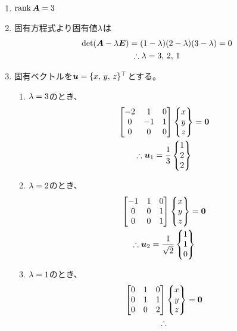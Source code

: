 \begin{ans*}
  ${}$
  \begin{enumerate}[label=(\arabic*)]
    \item $\operatorname{rank}\bm{A} = 3$
    \item 固有方程式より固有値${\lambda}$は
    \begin{gather}
      \det(\bm{A} - {\lambda}\bm{E}) = (1-{\lambda})(2-{\lambda})(3-{\lambda}) = 0 \\
      \therefore {\lambda} = 3,\,2,\,1
    \end{gather}
    \item 固有ベクトルを${\bm{u}} = \{x,\,y,\,z\}^{\top}$とする。
    \begin{enumerate}[label=(\roman*)]
      \item ${\lambda} = 3$のとき、
      \begin{gather}
        \begin{bmatrix}
          -2 & 1 & 0 \\
          0 & -1 & 1 \\
          0 & 0 & 0
        \end{bmatrix}\begin{Bmatrix}
          x \\ y \\ z
        \end{Bmatrix} = \bm{0} \\
        \therefore
        {\bm{u}}_{1} = \frac{1}{3}\begin{Bmatrix}
          1 \\ 2 \\ 2
        \end{Bmatrix}
      \end{gather}
      \item ${\lambda} = 2$のとき、
      \begin{gather}
        \begin{bmatrix}
          -1 & 1 & 0 \\
          0 & 0 & 1 \\
          0 & 0 & 1
        \end{bmatrix}\begin{Bmatrix}
          x \\ y \\ z
        \end{Bmatrix} = \bm{0} \\
        \therefore
        {\bm{u}}_{2} = \frac{1}{\sqrt{2}}\begin{Bmatrix}
          1 \\ 1 \\ 0
        \end{Bmatrix}
      \end{gather}
      \item ${\lambda} = 1$のとき、
      \begin{gather}
        \bmat{
          0 & 1 & 0 \\
          0 & 1 & 1 \\
          0 & 0 & 2
        }\Bmat{
          x \\ y \\ z
        } = \bzv \\
        \therefore

\end{gather}
\end{enumerate}
\end{enumerate}
\end{ans*}
